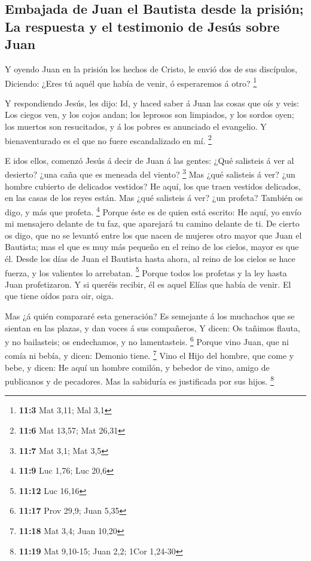 \hypertarget{embajada-de-juan-el-bautista-desde-la-prisiuxf3n-la-respuesta-y-el-testimonio-de-jesuxfas-sobre-juan}{%
\subsection{Embajada de Juan el Bautista desde la prisión; La respuesta
y el testimonio de Jesús sobre
Juan}\label{embajada-de-juan-el-bautista-desde-la-prisiuxf3n-la-respuesta-y-el-testimonio-de-jesuxfas-sobre-juan}}

 Y oyendo Juan en la prisión los hechos de Cristo, le envió
dos de sus discípulos,  Diciendo: ¿Eres tú aquél que había
de venir, ó esperaremos á otro? \footnote{\textbf{11:3} Mat 3,11; Mal
  3,1}

 Y respondiendo Jesús, les dijo: Id, y haced saber á Juan
las cosas que oís y veis:  Los ciegos ven, y los cojos
andan; los leprosos son limpiados, y los sordos oyen; los muertos son
resucitados, y á los pobres es anunciado el evangelio.  Y
bienaventurado es el que no fuere escandalizado en mí. \footnote{\textbf{11:6}
  Mat 13,57; Mat 26,31}

 E idos ellos, comenzó Jesús á decir de Juan á las gentes:
¿Qué salisteis á ver al desierto? ¿una caña que es meneada del viento?
\footnote{\textbf{11:7} Mat 3,1; Mat 3,5}  Mas ¿qué
salisteis á ver? ¿un hombre cubierto de delicados vestidos? He aquí, los
que traen vestidos delicados, en las casas de los reyes están.
 Mas ¿qué salisteis á ver? ¿un profeta? También os digo, y
más que profeta. \footnote{\textbf{11:9} Luc 1,76; Luc 20,6}
 Porque éste es de quien está escrito: He aquí, yo envío mi
mensajero delante de tu faz, que aparejará tu camino delante de ti.
 De cierto os digo, que no se levantó entre los que nacen
de mujeres otro mayor que Juan el Bautista; mas el que es muy más
pequeño en el reino de los cielos, mayor es que él.  Desde
los días de Juan el Bautista hasta ahora, al reino de los cielos se hace
fuerza, y los valientes lo arrebatan. \footnote{\textbf{11:12} Luc 16,16}
 Porque todos los profetas y la ley hasta Juan
profetizaron.  Y si queréis recibir, él es aquel Elías que
había de venir.  El que tiene oídos para oir, oiga.

 Mas ¿á quién compararé esta generación? Es semejante á los
muchachos que se sientan en las plazas, y dan voces á sus compañeros,
 Y dicen: Os tañimos flauta, y no bailasteis; os
endechamos, y no lamentasteis. \footnote{\textbf{11:17} Prov 29,9; Juan
  5,35}  Porque vino Juan, que ni comía ni bebía, y dicen:
Demonio tiene. \footnote{\textbf{11:18} Mat 3,4; Juan 10,20}
 Vino el Hijo del hombre, que come y bebe, y dicen: He aquí
un hombre comilón, y bebedor de vino, amigo de publicanos y de
pecadores. Mas la sabiduría es justificada por sus hijos. \footnote{\textbf{11:19}
  Mat 9,10-15; Juan 2,2; 1Cor 1,24-30}

